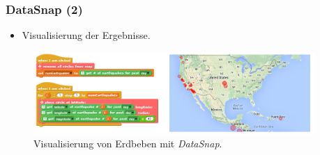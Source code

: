\begin{frame}
  \frametitle{DataSnap (2)}

  \begin{itemize}
    \item Visualisierung der Ergebnisse.
  \end{itemize}
  \begin{figure}
    \begin{center}
      \includegraphics[width=0.95\textwidth]{assets/datasnap-visualization.png}
    \end{center}
    \caption{Visualisierung von Erdbeben mit \textit{DataSnap}. \parencite[28]{hellmannDataSnapEnabling2015}}
  \end{figure}


\end{frame}
